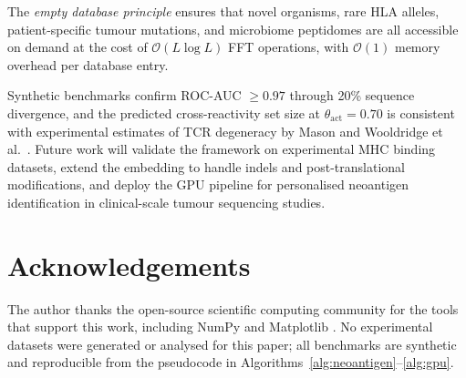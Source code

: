 \documentclass[twocolumn,11pt,a4paper]{article}
\theoremstyle{definition}
\theoremstyle{remark}
\begin{document}
The \emph{empty database principle} ensures that novel organisms, rare HLA
alleles, patient-specific tumour mutations, and microbiome peptidomes are all
accessible on demand at the cost of $\mathcal{O}(L\log L)$ FFT operations,
with $\mathcal{O}(1)$ memory overhead per database entry.

Synthetic benchmarks confirm ROC-AUC $\geq 0.97$ through 20\% sequence
divergence, and the predicted cross-reactivity set size at
$\theta_{\mathrm{act}} = 0.70$ is consistent with experimental estimates of
TCR degeneracy by Mason \citep{mason1998} and Wooldridge et al.\
\citep{wooldridge2012}. Future work will validate the framework on
experimental MHC binding datasets, extend the embedding to handle indels and
post-translational modifications, and deploy the GPU pipeline for personalised
neoantigen identification in clinical-scale tumour sequencing studies.

\section*{Acknowledgements}
The author thanks the open-source scientific computing community for the
tools that support this work, including NumPy \citep{harris2020numpy} and
Matplotlib \citep{hunter2007matplotlib}. No experimental datasets were
generated or analysed for this paper; all benchmarks are synthetic and
reproducible from the pseudocode in
Algorithms~\ref{alg:neoantigen}--\ref{alg:gpu}.


\end{document}
